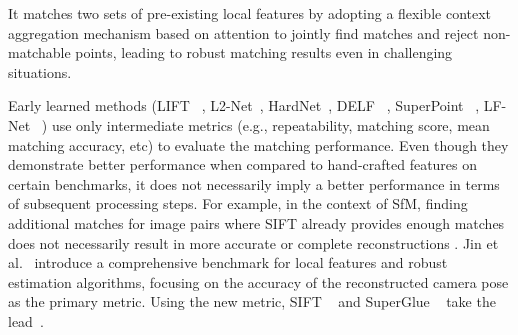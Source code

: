 It matches two sets of pre-existing local features by adopting a flexible context aggregation mechanism based on attention to jointly find matches and reject non-matchable points, leading to robust matching results even in challenging situations.
\par
Early learned methods (LIFT ~\cite{yi2016lift}, L2-Net~\cite{tian2017l2}, HardNet~\cite{mishchuk2017working}, DELF ~\cite{noh2017DELF}, SuperPoint ~\cite{detone2018superpoint}, LF-Net ~\cite{ono2018lf}) use only intermediate metrics (e.g., repeatability, matching score, mean matching accuracy, etc) to evaluate the matching performance. 
Even though they demonstrate better performance when compared to hand-crafted features on certain benchmarks, it does not necessarily imply a better performance in terms of subsequent processing steps. For example, in the context of \ac{SfM}, finding additional matches for image pairs where SIFT already provides enough matches does not necessarily result in more accurate or complete reconstructions \cite{schonberger2017comparative}.
Jin et al.~\cite{jin2020image} introduce a comprehensive benchmark for local features and robust estimation algorithms, focusing on the accuracy of the reconstructed camera pose as the primary metric. Using the new metric, SIFT ~\cite{lowe2004distinctive} and SuperGlue ~\cite{sarlin2020superglue} take the lead~\cite{imagematchingchallenge2020}.

